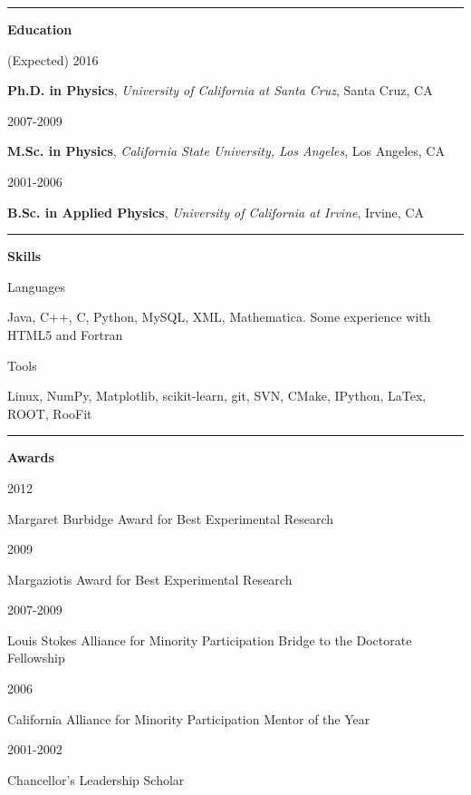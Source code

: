 \documentclass[11pt]{article}
\newcommand{\resumesection}[1] {
    \noindent
    \textcolor{indigodye}{\rule{.15\textwidth}{.1in} \hspace{0.01 \textwidth} \textbf{\Large{#1}}} \newline
}
\newcommand{\educationentry}[4] { 
    \noindent
    \begin{minipage}[t]{0.15\textwidth} \begin{flushright} #1 \end{flushright} \end{minipage} \hspace{0.01\textwidth}
    \begin{minipage}[t]{0.84\textwidth} 
        \textbf{#2}, \emph{#3}, #4
    \end{minipage}
}
\newcommand{\skillsentry}[2] { 
    \noindent
    \begin{minipage}[t]{0.15\textwidth} \begin{flushright} #1 \end{flushright} \end{minipage} \hspace{0.01\textwidth}
    \begin{minipage}[t]{0.84\textwidth} #2 \end{minipage}
}
\newcommand{\awardentry}[2] { 
    \noindent
    \begin{minipage}[t]{0.15\textwidth} \begin{flushright} #1 \end{flushright} \end{minipage} \hspace{0.01\textwidth}
    \begin{minipage}[t]{0.84\textwidth} #2 \end{minipage}
}
\begin{document}
    \resumesection{Education}
        \educationentry{(Expected) 2016}
                       {Ph.D. in Physics}
                       {University of California at Santa Cruz}
                       {Santa Cruz, CA}
        \educationentry{2007-2009}
                       {M.Sc. in Physics}
                       {California State University, Los Angeles}
                       {Los Angeles, CA}
        \educationentry{2001-2006}
                       {B.Sc. in Applied Physics}
                       {University of California at Irvine}
                       {Irvine, CA}

    \resumesection{Skills}
    \skillsentry{Languages}{Java, C++, C, Python, MySQL, XML, Mathematica. Some experience with HTML5 and Fortran}
        \skillsentry{Tools}{Linux, NumPy, Matplotlib, scikit-learn, git, SVN, CMake, IPython, LaTex, ROOT, RooFit}

    \resumesection{Awards}
        \awardentry{2012}{Margaret Burbidge Award for Best Experimental Research}
        \awardentry{2009}{Margaziotis Award for Best Experimental Research}
        \awardentry{2007-2009}{Louis Stokes Alliance for Minority Participation Bridge to the Doctorate 
                               Fellowship}
        \awardentry{2006}{California Alliance for Minority Participation Mentor of the Year}
        \awardentry{2001-2002}{Chancellor's Leadership Scholar}
\end{document}
